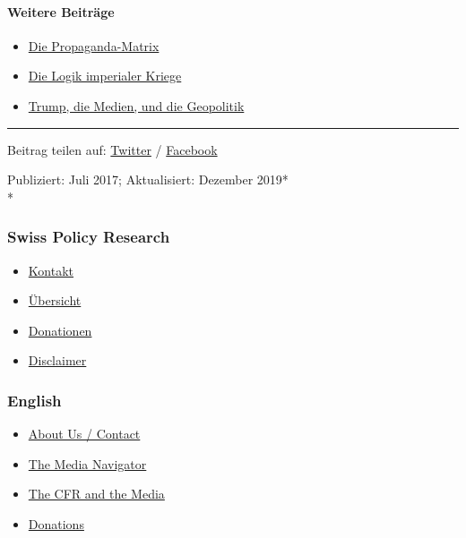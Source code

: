 \hypertarget{weitere-beitruxe4ge}{%
\paragraph{Weitere Beiträge}\label{weitere-beitruxe4ge}}

\begin{itemize}
\tightlist
\item
  \href{https://swprs.org/die-propaganda-matrix/}{Die Propaganda-Matrix}
\item
  \href{https://swprs.org/logik-imperialer-kriege/}{Die Logik imperialer
  Kriege}
\item
  \href{https://swprs.org/trump-medien-geopolitik/}{Trump, die Medien,
  und die Geopolitik}
\end{itemize}

\begin{center}\rule{0.5\linewidth}{\linethickness}\end{center}

Beitrag teilen auf:
\href{https://twitter.com/intent/tweet?url=https://swprs.org/das-american-empire-und-seine-medien/}{Twitter}
/
\href{https://www.facebook.com/share.php?u=https://swprs.org/das-american-empire-und-seine-medien/}{Facebook}

Publiziert: Juli 2017; Aktualisiert: Dezember 2019*\\
*

\hypertarget{swiss-policy-research}{%
\subsubsection{Swiss Policy Research}\label{swiss-policy-research}}

\begin{itemize}
\tightlist
\item
  \href{https://swprs.org/kontakt/}{Kontakt}
\item
  \href{https://swprs.org/uebersicht/}{Übersicht}
\item
  \href{https://swprs.org/donationen/}{Donationen}
\item
  \href{https://swprs.org/disclaimer/}{Disclaimer}
\end{itemize}

\hypertarget{english}{%
\subsubsection{English}\label{english}}

\begin{itemize}
\tightlist
\item
  \href{https://swprs.org/contact/}{About Us / Contact}
\item
  \href{https://swprs.org/media-navigator/}{The Media Navigator}
\item
  \href{https://swprs.org/the-american-empire-and-its-media/}{The CFR
  and the Media}
\item
  \href{https://swprs.org/donations/}{Donations}
\end{itemize}


